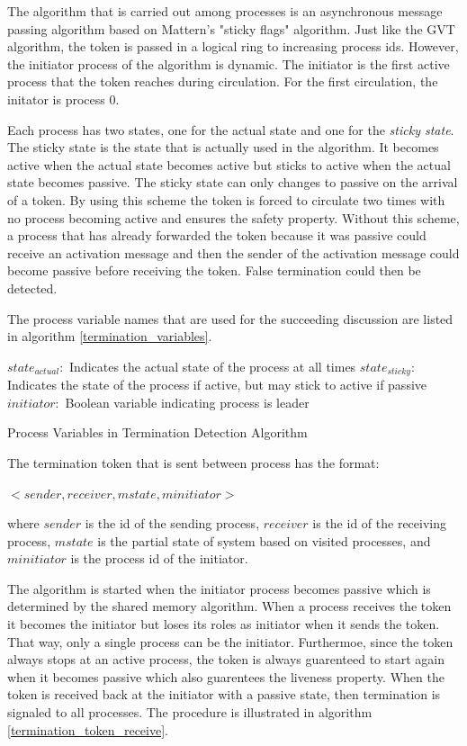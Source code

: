 \documentclass[11pt]{book}
\begin{document}
The algorithm that is carried out among processes is an asynchronous message passing
algorithm based on Mattern's "sticky flags" algorithm\cite{mattern-93}. Just like the GVT
algorithm, the token is passed in a logical ring to increasing process ids. However, the
initiator process of the algorithm is dynamic. The initiator is the first active process
that the token reaches during circulation. For the first circulation, the initator is process
0.

Each process has two states, one for the actual state and one for the \emph{sticky state}.
The sticky state is the state that is actually used in the algorithm. It becomes active
when the actual state becomes active but sticks to active when the actual state becomes
passive. The sticky state can only changes to passive on the arrival of a token. By using
this scheme the token is forced to circulate two times with no process becoming active and
ensures the safety property. Without this scheme, a process that has already forwarded the
token because it was passive could receive an activation message and then the sender of the
activation message could become passive before receiving the token. False termination could
then be detected.

The process variable names that are used for the succeeding discussion are listed in
algorithm \ref{termination_variables}.

\begin{algorithm}
\DontPrintSemicolon
    \boldmath$state_{actual}:$ Indicates the actual state of the process at all times\;
    \boldmath$state_{sticky}:$ Indicates the state of the process if active, but may stick
        to active if passive\;
    \boldmath$initiator:$ Boolean variable indicating process is leader\;
\caption{Process Variables in Termination Detection Algorithm}\label{termination_variables}
\end{algorithm}

\noindent
The termination token that is sent between process has the format:

    $<sender, receiver, mstate, minitiator>$

\noindent
where $sender$ is the id of the sending process, $receiver$ is the id of the receiving
process, $mstate$ is the partial state of system based on visited processes, and $minitiator$
is the process id of the initiator.

The algorithm is started when the initiator process becomes passive which is determined by
the shared memory algorithm. When a process receives the token it becomes the initiator
but loses its roles as initiator when it sends the token. That way, only a single process
can be the initiator. Furthermoe, since the token always stops at an active process, the
token is always guarenteed to start again when it becomes passive which also guarentees
the liveness property. When the token is received back at the initiator with a passive
state, then termination is signaled to all processes. The procedure is illustrated in
algorithm \ref{termination_token_receive}.
\end{document}
